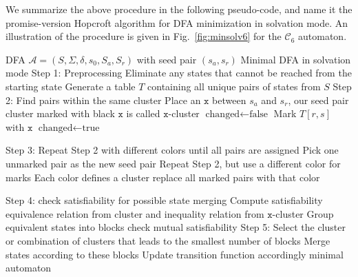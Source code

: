 \documentclass[../main.tex]{subfiles}
\begin{document}
We summarize the above procedure in the following pseudo-code, and name it the promise-version Hopcroft algorithm for DFA minimization in solvation mode. An illustration of the procedure is given in Fig.~\ref{fig:minsolv6} for the $\mathcal{C}_6$ automaton.

\begin{algorithm}[H]
\caption{Promise-version Hopcroft Algorithm}
\label{alg:mindfasolv}
\begin{algorithmic}

\REQUIRE DFA $\mathcal{A} = (S, \Sigma, \delta, s_0, S_a, S_r)$ with seed pair $(s_a, s_r)$
\ENSURE Minimal DFA in solvation mode
\STATE Step 1: Preprocessing
\STATE Eliminate any states that cannot be reached from the starting state
\STATE Generate a table $T$ containing all unique pairs of states from $S$
\STATE Step 2: Find pairs within the same cluster
\STATE Place an $\mathtt{x}$ between $s_a$ and $s_r$, our seed pair
\STATE cluster marked with black $\mathtt{x}$ is called $\mathtt{x}$-cluster
\REPEAT
    \STATE $\text{changed} \leftarrow \text{false}$
                    \STATE Mark $T[r,s]$ with $\mathtt{x}$
                    \STATE $\text{changed} \leftarrow \text{true}$
                \ENDIF
            \ENDFOR
        \ENDFOR
    \ENDFOR
{}

\STATE Step 3: Repeat Step 2 with different colors until all pairs are assigned
    \STATE Pick one unmarked pair as the new seed pair
    \STATE Repeat Step 2, but use a different color for marks
    \STATE Each color defines a cluster
        \STATE replace all marked pairs with that color
    \ENDIF
\ENDWHILE

\STATE Step 4: check satisfiability for possible state merging
    \STATE Compute satisfiability equivalence relation from cluster and inequality relation from  $\mathtt{x}$-cluster
        \STATE Group equivalent states into blocks
    \ENDIF
\ENDFOR
{}
    \STATE check mutual satisfiability
\ENDFOR
\STATE Step 5: Select the cluster or combination of clusters that leads to the smallest number of blocks
\STATE Merge states according to these blocks
\STATE Update transition function accordingly
\STATE \RETURN minimal automaton

\end{algorithmic}
\end{algorithm}
\end{document}
